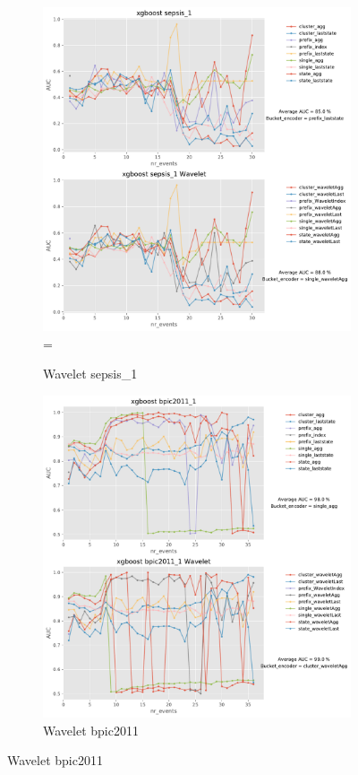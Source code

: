 \begin{figure}[!htbp] %
	
	\begin{subfigure}{0.48\textwidth}
		\includegraphics[width=\linewidth]{images/wavelet/graphs2/sepsis_1.pdf}=
		\caption{Wavelet sepsis\_1} \label{fig:sepsisw}
	\end{subfigure}\hspace*{\fill}
	\begin{subfigure}{0.48\textwidth}
		\includegraphics[width=\linewidth]{images/wavelet/graphs2/bpic2011_1.pdf}
		\caption{Wavelet bpic2011} \label{fig:b11w}
	\end{subfigure}
	

\end{figure}
